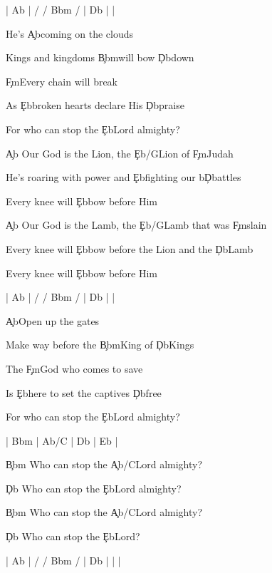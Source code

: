 \documentclass[9pt]{extarticle}
\begin{document}
\bsong

\bi[2]
| Ab |  / / Bbm /  | Db |  |
\ei

\bv
He's \c{Ab}coming on the clouds

Kings and kingdoms \c{Bbm}will bow \c{Db}down

\c{Fm}Every chain will break

As \c{Eb}broken hearts declare His \c{Db}praise

For who can stop the \c{Eb}Lord almighty?
\ev

\bc
\c{Ab} Our God is the Lion, the \c{Eb/G}Lion of \c{Fm}Judah

He’s roaring with power and \c{Eb}fighting our b\c{Db}attles

Every knee will \c{Eb}bow before Him



\c{Ab} Our God is the Lamb, the \c{Eb/G}Lamb that was \c{Fm}slain


Every knee will \c{Eb}bow before the Lion and the \c{Db}Lamb

Every knee will \c{Eb}bow before Him
\ec

\bin[2]
| Ab |  / / Bbm /  | Db |  |
\ein

\bv
\c{Ab}Open up the gates

Make way before the \c{Bbm}King of \c{Db}Kings

The \c{Fm}God who comes to save

Is \c{Eb}here to set the captives \c{Db}free

For who can stop the \c{Eb}Lord almighty?
\ev


\bin
| Bbm |  Ab/C  | Db | Eb |
\ein

\bb[3]
\c{Bbm} Who can stop the \c{Ab/C}Lord almighty?

\c{Db} Who can stop the \c{Eb}Lord almighty?
\eb

\bb
\c{Bbm} Who can stop the \c{Ab/C}Lord almighty?

\c{Db} Who can stop the \c{Eb}Lord?
\eb


\bo[2]
| Ab |  / / Bbm /  | Db |  |  |
\eo

\esong
\end{document}
